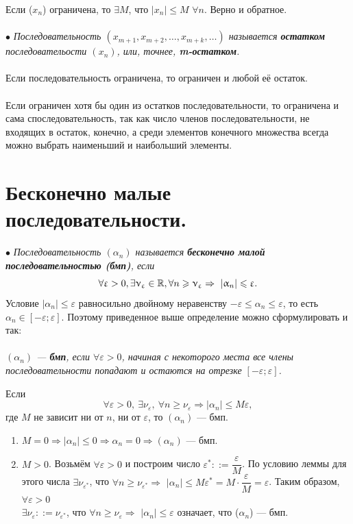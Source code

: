Если ($x_n$) ограничена, то $\exists M$, что $|x_n| \leqslant M$ $\forall n$. Верно и обратное.\\\\
$\bullet$ \textit{Последовательность $(x_{m+1},x_{m+2},\ldots,x_{m+k},\ldots)$ называется \textbf{остатком} последовательости $(x_n)$, или, точнее, \textbf{m-остатком}.}\\\\
Если последовательность ограничена, то ограничен и любой её остаток.\\\\
Если ограничен хотя бы один из остатков последовательности, то ограничена и сама споследовательность, так как число членов последовательности, не входящих в остаток, конечно, а среди элементов конечного множества всегда можно выбрать наименьший и наибольший элементы.
\section{Бесконечно малые последовательности.}
$\bullet$ \textit{Последовательность $(\alpha_n)$ называется \textbf{бесконечно малой последовательностью (бмп)}, если} $$\forall\upvarepsilon>0, \exists\upnu_\upvarepsilon\in\mathbb{R},\forall n  \geqslant \upnu_\upvarepsilon \Rightarrow\ |\upalpha_n|\leqslant \upvarepsilon.$$
Условие $|\alpha_n|\leqslant\varepsilon$ равносильно двойному неравенству $-\varepsilon\leqslant\alpha_n\leqslant\varepsilon$, то есть $\alpha_n\in [-\varepsilon;\varepsilon]$. Поэтому приведенное выше определение можно сформулировать и так:\\\\
\textit{$(\alpha_n)$ --- \textbf{бмп}, если $\forall\varepsilon > 0$, начиная с некоторого места все члены последовательности попадают и остаются на отрезке $[-\varepsilon;\varepsilon]$.}
\begin{lem}
	Если $$\forall\varepsilon > 0,\ \exists\nu_\varepsilon,\ \forall n  \geqslant \nu_\varepsilon \Rightarrow |\alpha_n|\leqslant M\varepsilon,$$ где $M$ не зависит ни от $n$, ни от $\varepsilon$, то $(\alpha_n)$ --- бмп.
\end{lem}
\begin{Proof}
	\begin{enumerate}
		\item $M=0 \Rightarrow |\alpha_n|\leqslant 0 \Rightarrow \alpha_n = 0 \Rightarrow (\alpha_n)$ --- бмп.
		\item $M>0$. Возьмём $\forall\varepsilon > 0$ и построим число $\varepsilon^*::=\dfrac{\varepsilon}{M}$. По условию леммы для этого числа $\exists\nu_{\varepsilon^*}$, что $\forall n \geqslant\nu_{\varepsilon^*}\Rightarrow$  $|\alpha_n|\leqslant M\varepsilon^* = M \cdot \dfrac{\varepsilon}{M}=\varepsilon$. Таким образом, $\forall\varepsilon > 0$\\ 
		$\exists\nu_\varepsilon::=\nu_{\varepsilon^*}$, что $\forall n \geqslant\nu_{\varepsilon}\Rightarrow$  $|\alpha_n|\leqslant \varepsilon$ означает, что ($\alpha_n$) --- бмп.
	\end{enumerate}
\end{Proof}
